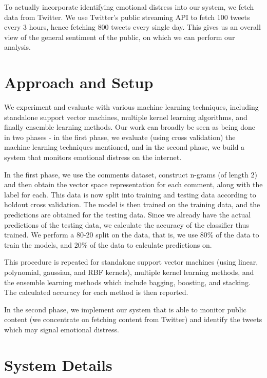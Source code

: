 To actually incorporate identifying emotional distress into our system, we fetch data from Twitter. We use Twitter's public streaming API \cite{twitter_streaming_api} to fetch 100 tweets every 3 hours, hence fetching 800 tweets every single day. This gives us an overall view of the general sentiment of the public, on which we can perform our analysis.

\section{Approach and Setup}
We experiment and evaluate with various machine learning techniques, including standalone support vector machines, multiple kernel learning algorithms, and finally ensemble learning methods. Our work can broadly be seen as being done in two phases - in the first phase, we evaluate (using cross validation) the machine learning techniques mentioned, and in the second phase, we build a system that monitors emotional distress on the internet.

In the first phase, we use the comments \cite{kaggle} dataset, construct n-grams (of length 2) and then obtain the vector space representation for each comment, along with the label for each. This data is now split into training and testing data according to holdout cross validation. The model is then trained on the training data, and the predictions are obtained for the testing data. Since we already have the actual predictions of the testing data, we calculate the accuracy of the classifier thus trained. We perform a 80-20 split on the data, that is, we use 80\% of the data to train the models, and 20\% of the data to calculate predictions on.

This procedure is repeated for standalone support vector machines (using linear, polynomial, gaussian, and RBF kernels), multiple kernel learning methods, and the ensemble learning methods which include bagging, boosting, and stacking. The calculated accuracy for each method is then reported.

In the second phase, we implement our system that is able to monitor public content (we concentrate on fetching content from Twitter) and identify the tweets which may signal emotional distress.

\section{System Details}
